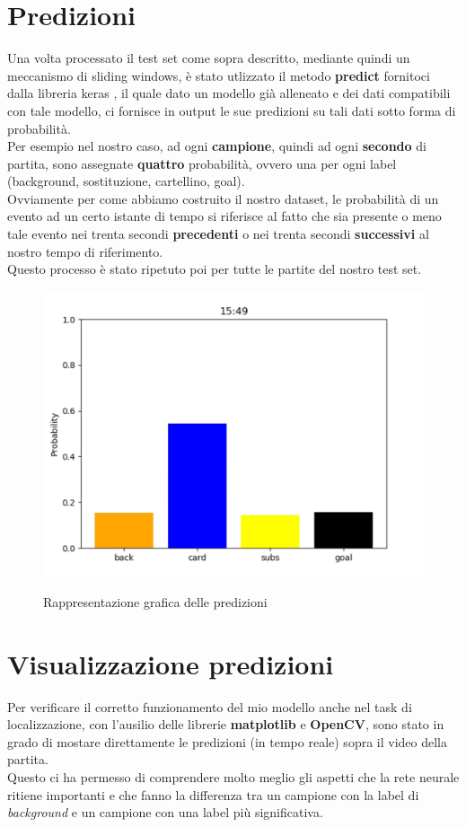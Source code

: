\section{Predizioni}
Una volta processato il test set come sopra descritto, mediante quindi un meccanismo di sliding windows, è stato utlizzato il metodo \textbf{predict} fornitoci dalla libreria keras \cite{chollet2015keras}, il quale dato un modello già alleneato e dei dati compatibili con tale modello, ci fornisce in output le sue predizioni su tali dati sotto forma di probabilità. 
\\Per esempio nel nostro caso, ad ogni \textbf{campione}, quindi ad ogni \textbf{secondo} di partita, sono assegnate \textbf{quattro} probabilità, ovvero una per ogni label (background, sostituzione, cartellino, goal).
\\Ovviamente per come abbiamo costruito il nostro dataset, le probabilità di un evento ad un certo istante di tempo si riferisce al fatto che sia presente o meno tale evento nei trenta secondi \textbf{precedenti} o nei trenta secondi \textbf{successivi} al nostro tempo di riferimento.
\\Questo processo è stato ripetuto poi per tutte le partite del nostro test set.
\begin{figure}[ht]
\centering
\caption{Rappresentazione grafica delle predizioni}
\includegraphics[width=\linewidth]{img/predict.png}
\label{figure : predict}
\end{figure}
\section{Visualizzazione predizioni}
Per verificare il corretto funzionamento del mio modello anche nel task di localizzazione, con l'ausilio delle librerie \textbf{matplotlib} e \textbf{OpenCV}, sono stato in grado di mostare direttamente le predizioni (in tempo reale) sopra il video della partita.
\\Questo ci ha permesso di comprendere molto meglio gli aspetti che la rete neurale ritiene importanti e che fanno la differenza tra un campione con la label di \textit{background} e un campione con una label più significativa.


